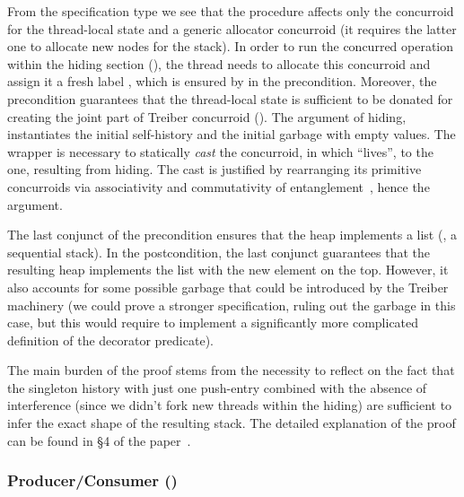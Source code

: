 From the specification type  we see that the
procedure  affects only the concurroid 
for the thread-local state and a generic allocator concurroid
 (it requires the latter one to allocate new nodes for
the stack). In order to run the concurred operation 
within the hiding section (), the thread needs to
allocate this concurroid and assign it a fresh label , which
is ensured by  in the precondition. Moreover,
the precondition guarantees that the thread-local state is sufficient
to be donated for creating the joint part of Treiber concurroid
(). The argument  of hiding, instantiates the initial self-history and the
initial garbage with empty values. 
%
The wrapper  is necessary to
statically \emph{cast} the concurroid, in which 
``lives'', to the one, resulting from hiding. The cast is justified by
rearranging its primitive concurroids via associativity and
commutativity of entanglement~\cite{Nanevski-al:ESOP14}, hence the
  argument.

The last conjunct  of the precondition ensures
that the heap  implements a list (\ie, a sequential
stack). In the postcondition, the last conjunct  guarantees that the resulting heap implements the list with the
new element  on the top. However, it also accounts for some
possible garbage  that could be introduced by the Treiber
machinery (we could prove a stronger specification, ruling out the
garbage in this case, but this would require to implement a
significantly more complicated definition of the decorator predicate).

The main burden of the proof stems from the necessity to reflect on
the fact that the singleton history with just one push-entry combined
with the absence of interference (since we didn't fork new threads
within the hiding) are sufficient to infer the exact shape of the
resulting stack. The detailed explanation of the proof can be found in
\S 4 of the paper~\cite{Sergey-al:ESOP15}.


\subsubsection{Producer/Consumer ()}
\label{sec:producerconsumer}


